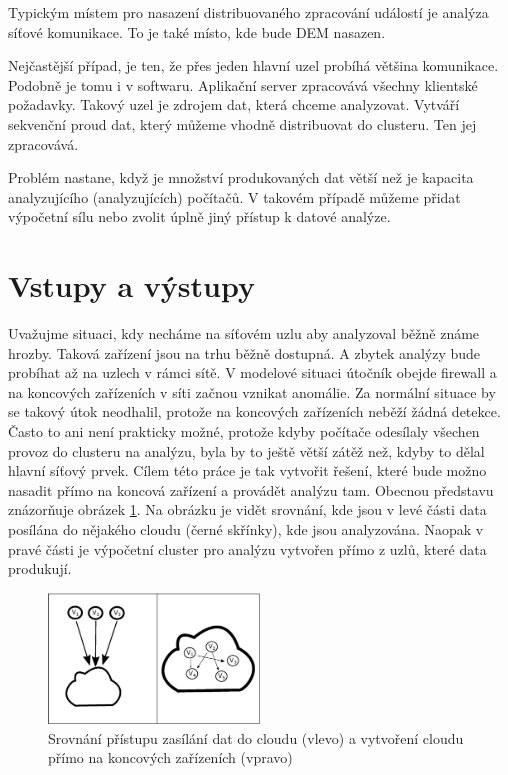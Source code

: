 \documentclass[
  digital, %
  table,   %
  nolof,     %
  nolot,     %
  oneside, %
  nocover,
  monochrome,
  12pt
]{fithesis3}
\begin{document}
Typickým místem pro nasazení distribuovaného zpracování událostí je analýza síťové komunikace. To je také místo, kde bude DEM nasazen.

Nejčastější případ, je ten, že přes jeden hlavní uzel probíhá většina komunikace. Podobně je tomu i v softwaru. Aplikační server zpracovává všechny klientské požadavky. Takový uzel je zdrojem dat, která chceme analyzovat. Vytváří sekvenční proud dat, který můžeme vhodně distribuovat do clusteru. Ten jej zpracovává.

Problém nastane, když je množství produkovaných dat větší než je kapacita analyzujícího (analyzujících) počítačů. V takovém případě můžeme přidat výpočetní sílu nebo zvolit úplně jiný přístup k datové analýze.

\section{Vstupy a výstupy}
Uvažujme situaci, kdy necháme na síťovém uzlu aby analyzoval běžně známe hrozby. Taková zařízení jsou na trhu běžně dostupná. A zbytek analýzy bude probíhat až na uzlech v rámci sítě. V modelové situaci útočník obejde firewall a na koncových zařízeních v síti začnou vznikat anomálie. Za normální situace by se takový útok neodhalil, protože na koncových zařízeních neběží žádná detekce. Často to ani není prakticky možné, protože kdyby počítače odesílaly všechen provoz do clusteru na analýzu, byla by to ještě větší zátěž než, kdyby to dělal hlavní síťový prvek. Cílem této práce je tak vytvořit řešení, které bude možno nasadit přímo na koncová zařízení a provádět analýzu tam. Obecnou představu znázorňuje obrázek \ref{fig:cloud-comparison}. Na obrázku je vidět srovnání, kde jsou v levé části data posílána do nějakého cloudu (černé skřínky), kde jsou analyzována. Naopak v pravé části je výpočetní cluster pro analýzu vytvořen přímo z uzlů, které data produkují. 

\begin{figure}[H]
	\centering
    \includegraphics[width=0.5\textwidth, height=0.20\textheight]{images/cloud-comparison.eps}
    \caption{Srovnání přístupu zasílání dat do cloudu (vlevo) a vytvoření cloudu přímo na koncových zařízeních (vpravo)}
    \label{fig:cloud-comparison}
\end{figure}
\end{document}
